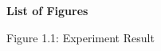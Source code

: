\begin{adjustwidth}{0.2cm}{0.2cm}

    \begin{center}
        {\englishfont\fontsize{14pt}{21pt}\selectfont \textbf{List of Figures} \par}
    \end{center}
    \label{lof}

    \vspace{1cm}
    \setlength{\parindent}{0pt}
    \vspace{0.3cm}
    {\large Figure 1.1: Experiment Result\dotfill\pageref{abstract}\hspace{0.1cm}\par}

\end{adjustwidth}